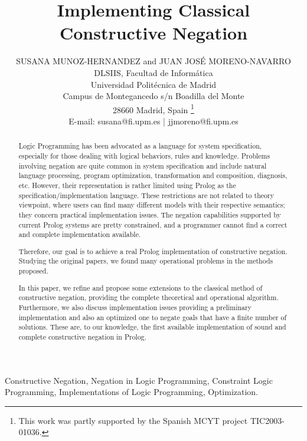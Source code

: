 \documentclass{tlp}
\begin{document}


\long{}


\title{Implementing Classical Constructive Negation}

\author[S. Munoz-Hernandez and J.J. Moreno-Navarro]
{SUSANA MUNOZ-HERNANDEZ and JUAN JOS\'{E} MORENO-NAVARRO \\
DLSIIS, Facultad de Inform\'{a}tica \\
Universidad Polit\'{e}cnica de  Madrid \\ 
Campus de Montegancedo s/n Boadilla del Monte\\
28660 Madrid, Spain \footnote{This work was partly supported by the
Spanish MCYT project TIC2003-01036.} \\
E-mail: susana@fi.upm.es | jjmoreno@fi.upm.es
}

\pagerange{\pageref{firstpage}--\pageref{lastpage}}
\setcounter{page}{1}

\maketitle

\label{firstpage}

\begin{abstract}
%
  Logic Programming has been advocated as a language for system
  specification, especially for those dealing with logical behaviors,
  rules and knowledge. Problems involving negation are quite common in
  system specification and include natural language processing,
  program optimization, transformation and composition, diagnosis,
  etc. However, their representation is rather limited using Prolog as
  the specification/implementation language. These restrictions are
  not related to theory viewpoint, where users can find many different
  models with their respective semantics; they concern practical
  implementation issues. The negation capabilities supported by
  current Prolog systems are pretty constrained, and a programmer
  cannot find a correct and complete implementation available.

  Therefore, our goal is to achieve a real Prolog implementation of
  constructive negation. Studying the original papers, we found many
  operational problems in the methods proposed.
 
  In this paper, we refine and propose some extensions to the
  classical method of constructive negation, providing the complete
  theoretical and operational algorithm. Furthermore, we also discuss
  implementation issues providing a preliminary implementation and
  also an optimized one to negate goals that have a finite number of
  solutions. These are, to our knowledge, the first available
  implementation of sound and complete constructive negation in
  Prolog.
\end{abstract}
\begin{keywords}
Constructive Negation, Negation in Logic Programming, Constraint Logic
Programming, Implementations of Logic Programming, Optimization.
\end{keywords}
\end{document}
